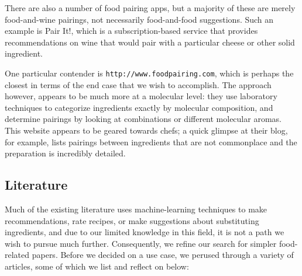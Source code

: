 \documentclass{article}
\begin{document}
There are also a number of food pairing apps, but a majority
of these are merely food-and-wine pairings, not necessarily
food-and-food suggestions. Such an example is Pair It!,
which is a subscription-based service that provides 
recommendations on wine that would pair with a particular
cheese or other solid ingredient.

One particular contender is \texttt{http://www.foodpairing.com},
which is perhaps the closest in terms of the end case that
we wish to accomplish. The approach however, appears to
be much more at a molecular level: they use laboratory techniques
to categorize ingredients exactly by molecular composition,
and determine pairings by looking at combinations 
or different molecular aromas. This website
appears to be geared towards chefs; a quick glimpse
at their blog, for example, lists pairings between
ingredients that are not commonplace and the preparation
is incredibly detailed.




\subsection{Literature}

Much of the existing literature uses machine-learning techniques to make
recommendations, rate recipes, or make suggestions about substituting ingredients, and due to our limited knowledge
in this field, it is not a path we wish to pursue much further. Consequently, we refine our search for simpler
food-related papers. Before we decided on a use case, we perused through a variety of articles, some of which
we list and reflect on below: \\
\end{document}
